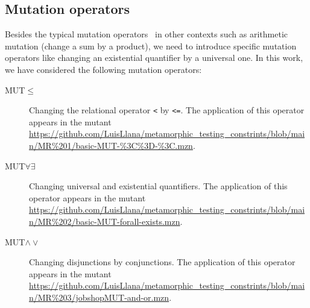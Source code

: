 \subsection{Mutation operators}
\label{s:mutOp}
Besides the typical mutation operators~\cite{parsai2literature} in other contexts such as
arithmetic mutation (change a sum by a product), we need to introduce
specific mutation operators like changing an existential quantifier by
a universal one. In this work, we have considered the following
mutation operators:


\begin{description}
    \item[MUT$\leq$] Changing the relational operator \lstinline|<| by  \lstinline|<=|.
      The application of this operator appears in the mutant
      \url{https://github.com/LuisLlana/metamorphic_testing_constrints/blob/main/MR%201/basic-MUT-%3C%3D-%3C.mzn}.

  \item[MUT$\forall\exists$]  Changing universal and existential quantifiers.
      The application of this operator appears in the mutant
      \url{https://github.com/LuisLlana/metamorphic_testing_constrints/blob/main/MR%202/basic-MUT-forall-exists.mzn}.

    \item[MUT$\wedge\vee$] Changing disjunctions by conjunctions. The application of
      this operator appears in the mutant
      \url{https://github.com/LuisLlana/metamorphic_testing_constrints/blob/main/MR%203/jobshopMUT-and-or.mzn}.


\end{description}
